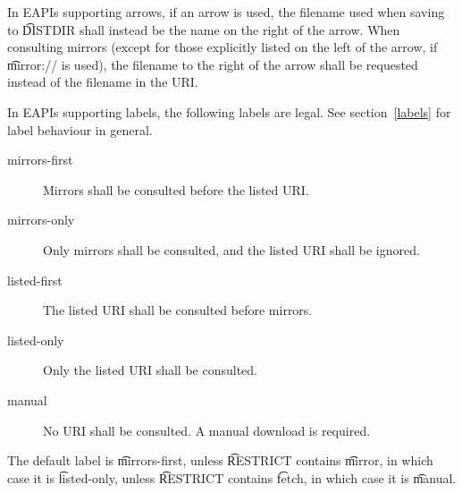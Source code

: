 \IFKDEBUILDELSE
{
In EAPIs supporting arrows, if an arrow is used, the filename used when saving to \t{DISTDIR} shall
instead be the name on the right of the arrow. When consulting mirrors (except for those explicitly
listed on the left of the arrow, if \t{mirror://} is used), the filename to the right of the arrow
shall be requested instead of the filename in the URI.

In EAPIs supporting labels, the following labels are legal. See section~\ref{labels} for label
behaviour in general.

\begin{description}
\item[mirrors-first] Mirrors shall be consulted before the listed URI.
\item[mirrors-only] Only mirrors shall be consulted, and the listed URI shall be ignored.
\item[listed-first] The listed URI shall be consulted before mirrors.
\item[listed-only] Only the listed URI shall be consulted.
\item[manual] No URI shall be consulted. A manual download is required.
\end{description}

The default label is \t{mirrors-first}, unless \t{RESTRICT} contains \t{mirror}, in which case it is
\t{listed-only}, unless \t{RESTRICT} contains \t{fetch}, in which case it is \t{manual}.
}{
}



